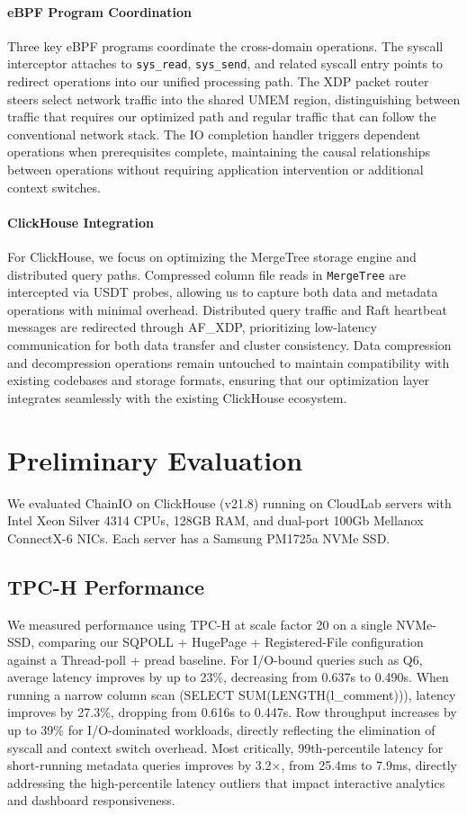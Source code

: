 \documentclass[sigconf,10pt]{acmart}
\newcommand{\sys}{ChainIO\xspace}
\begin{document}
\paragraph{eBPF Program Coordination}
Three key eBPF programs coordinate the cross-domain operations. The syscall interceptor attaches to \texttt{sys\_read}, \texttt{sys\_send}, and related syscall entry points to redirect operations into our unified processing path. The XDP packet router steers select network traffic into the shared UMEM region, distinguishing between traffic that requires our optimized path and regular traffic that can follow the conventional network stack. The IO completion handler triggers dependent operations when prerequisites complete, maintaining the causal relationships between operations without requiring application intervention or additional context switches.

\paragraph{ClickHouse Integration}
For ClickHouse, we focus on optimizing the MergeTree storage engine and distributed query paths. Compressed column file reads in \texttt{MergeTree} are intercepted via USDT probes, allowing us to capture both data and metadata operations with minimal overhead. Distributed query traffic and Raft heartbeat messages are redirected through AF\_XDP, prioritizing low-latency communication for both data transfer and cluster consistency. Data compression and decompression operations remain untouched to maintain compatibility with existing codebases and storage formats, ensuring that our optimization layer integrates seamlessly with the existing ClickHouse ecosystem.

\section{Preliminary Evaluation}\label{sec:evaluation}

We evaluated \sys on ClickHouse (v21.8) running on CloudLab servers with Intel Xeon Silver 4314 CPUs, 128GB RAM, and dual-port 100Gb Mellanox ConnectX-6 NICs. Each server has a Samsung PM1725a NVMe SSD.

\subsection{TPC-H Performance}

We measured performance using TPC-H at scale factor 20 on a single NVMe-SSD, comparing our SQPOLL + HugePage + Registered-File configuration against a Thread-poll + pread baseline. For I/O-bound queries such as Q6, average latency improves by up to 23\%, decreasing from 0.637s to 0.490s. When running a narrow column scan (SELECT SUM(LENGTH(l\_comment))), latency improves by 27.3\%, dropping from 0.616s to 0.447s. Row throughput increases by up to 39\% for I/O-dominated workloads, directly reflecting the elimination of syscall and context switch overhead. Most critically, 99th-percentile latency for short-running metadata queries improves by 3.2×, from 25.4ms to 7.9ms, directly addressing the high-percentile latency outliers that impact interactive analytics and dashboard responsiveness.
\end{document}
